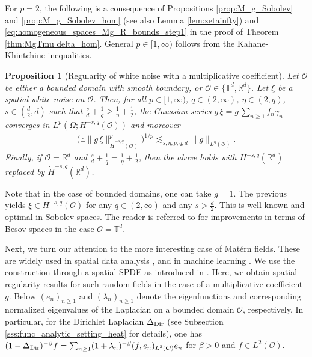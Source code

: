 \documentclass[reqno]{amsart}
\theoremstyle{plain}
\theoremstyle{remark}
\theoremstyle{plain}
\newtheorem{proposition}[theorem]{Proposition}
\numberwithin{equation}{section}
\newcommand\cO{\mathcal{O}}
\def\R{{\mathbb R}}
\newcommand{\E}{{\mathbb E}}
\newcommand{\g}{\gamma}
\renewcommand{\O}{\Omega}
\newcommand{\T}{\mathbb{T}}
\newcommand{\wt}{\widetilde}
\newcommand{\1}{\one}
\begin{document}
For $p=2$, the following is a consequence of Propositions \ref{prop:M_g_Sobolev} and \ref{prop:M_g_Sobolev_hom} (see also Lemma \ref{lem:zetainfty}) and \eqref{eq:homogeneous_spaces_Mg_R_bounds_step1} in the proof of Theorem \ref{thm:MgTmu delta_hom}. General $p\in [1, \infty)$ follows from the Kahane-Khintchine inequalities. 

\begin{proposition}[Regularity of white noise with a multiplicative coefficient]
Let $\cO$ be either a bounded domain with smooth boundary, or $\cO\in \{\T^d,\R^d\}$.
Let $\xi$ be a spatial white noise on $\cO$. 
Then, for all $p\in [1,\infty)$, $q\in (2, \infty)$,  $\eta\in (2, q)$, $s\in (\frac{d}{2},d)$ such that $\frac{s}{d}+\frac1q \geq \frac{1}{\eta} + \frac{1}{2}$, the Gaussian series $g\,\xi =g\,\sum_{n\geq 1} f_n \g_n$ converges in $L^p(\O;H^{-s,q}(\cO))$ and moreover
\begin{align*}
    \big(\E \|g \,\xi \|_{\wt{H}^{-s,q}(\mathcal{O})}^p\big)^{1/p} \lesssim_{s,\eta,p,q,d}  \|g\|_{L^\eta(\mathcal{O})}.
\end{align*}
Finally, if $\cO=\R^d$ and $\frac{s}{d}+\frac1q = \frac{1}{\eta} + \frac{1}{2}$, then the above holds with $H^{-s,q}(\R^d)$ replaced by $\dot{H}^{-s,q}(\R^d)$.
\end{proposition}


Note that in the case of bounded domains, one can take $g=1$. The previous yields $\xi\in H^{-s,q}(\mathcal{O})$ for any $q\in (2, \infty)$ and any $s>\frac{d}{2}$. This is well known and optimal in Sobolev spaces. The reader is referred to \cite{ArOh,V11_regularity_Besov} for improvements in terms of Besov spaces in the case $\cO=\T^d$. 

\smallskip

Next, we turn our attention to the more interesting case of Matérn fields. These are widely used in spatial data analysis \cite{SteinML}, and in machine learning \cite{RasWil}. We use the construction through a spatial SPDE as introduced in \cite{LRL}. 
Here, we obtain spatial regularity results for such random fields in the case of a multiplicative coefficient $g$. Below 
$(e_n)_{n\geq 1}$ and $(\lambda_n)_{n\geq 1}$ denote the eigenfunctions and corresponding normalized eigenvalues of the Laplacian on a bounded domain $\cO$, respectively. In particular, for the Dirichlet Laplacian $\Delta_{{\rm Dir}}$ (see Subsection \ref{sss:func_analytic_setting_heat} for details), one has $(1-\Delta_{{\rm Dir}})^{-\beta} f=\sum_{n\geq 1} (1+\lambda_n)^{-\beta}(f,e_n)_{L^2(\cO)}e_n$ for $\beta>0$ and $f\in L^2(\cO)$.
\end{document}

